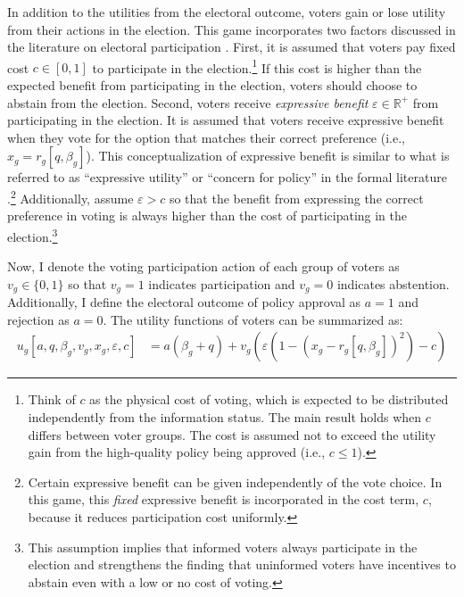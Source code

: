 \documentclass[doc,natbib,12pt]{apa6}
\begin{document}
	\par In addition to the utilities from the electoral outcome, voters gain or lose utility from their actions in the election. This game incorporates two factors discussed in the literature on electoral participation \citep{Downs1957anec, Riker1968thof}. First, it is assumed that voters pay fixed cost $c \in [0,1]$ to participate in the election.\footnote{Think of $c$ as the physical cost of voting, which is expected to be distributed independently from the information status. The main result holds when $c$ differs between voter groups. The cost is assumed not to exceed the utility gain from the high-quality policy being approved (i.e., $c \leq 1$).} If this cost is higher than the expected benefit from participating in the election, voters should choose to abstain from the election. Second, voters receive \textit{expressive benefit} $\varepsilon \in \mathbb{R}^+$ from participating in the election. It is assumed that voters receive expressive benefit when they vote for the option that matches their correct preference (i.e., $x_g=r_g[q, \beta_g]$). This conceptualization of expressive benefit is similar to what is referred to as ``expressive utility'' or ``concern for policy'' in the formal literature \citep{Dewan2008thqu, Kuran1997prtr, Little2015pran}.\footnote{Certain expressive benefit can be given independently of the vote choice. In this game, this \textit{fixed} expressive benefit is incorporated in the cost term, $c$, because it reduces participation cost uniformly.} Additionally, assume $\varepsilon > c$ so that the benefit from expressing the correct preference in voting is always higher than the cost of participating in the election.\footnote{This assumption implies that informed voters always participate in the election and strengthens the finding that uninformed voters have incentives to abstain even with a low or no cost of voting.}
	
	\par Now, I denote the voting participation action of each group of voters as $v_g \in \{0,1\}$ so that $v_g=1$ indicates participation and $v_g=0$ indicates abstention. Additionally, I define the electoral outcome of policy approval as $a=1$ and rejection as $a=0$. The utility functions of voters can be summarized as:
	\begin{align}
	u_g [a,q,\beta_g,v_g,x_g,\varepsilon,c] &= a(\beta_g + q) + v_g(\varepsilon(1-(x_g-r_g[q,\beta_g])^2)-c) \label{uf}
	\end{align}
	
\end{document}
